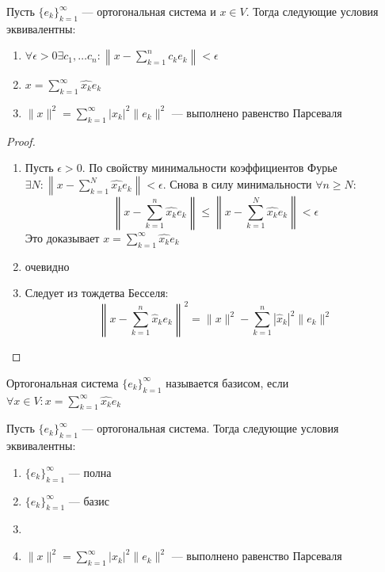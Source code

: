 \begin{theorem}
    Пусть \(\{e_k\}_{k = 1}^\infty\) --- ортогональная система и \(x \in V\). Тогда следующие условия эквивалентны:
    \begin{enumerate}
        \item \(\forall \epsilon > 0 \exists c_1, \dots c_n: \left\|x - \sum_{k = 1}^n c_ke_k\right\| < \epsilon\)
        \item \(x = \sum_{k = 1}^\infty \hat{x_k}e_k\)
        \item \(\|x\|^2 = \sum_{k = 1}^\infty |x_k|^2 \|e_k\|^2\) --- выполнено равенство Парсеваля
    \end{enumerate}
\end{theorem}
\begin{proof}
    \begin{enumerate}
        \item[\((1) \Ra (2)\)] Пусть \(\epsilon > 0\). По свойству минимальности коэффициентов Фурье \(\exists N: \left\| x - \sum_{k = 1}^N \hat{x_k}e_k \right\| < \epsilon\). Снова в силу минимальности \(\forall n \ge N\):
        \[\left\| x - \sum_{k = 1}^n \hat{x_k}e_k \right\| \le \left\| x - \sum_{k = 1}^N \hat{x_k}e_k \right\| < \epsilon\]
        Это доказывает \(x = \sum_{k = 1}^\infty \hat{x_k}e_k\)
        \item[\((2) \Ra (1)\)] очевидно
        \item[\((2) \Lra (3)\)] Следует из тождетва Бесселя:
        \[\left\| x - \sum_{k = 1}^n \widehat{x}_ke_k \right\|^2 = \|x\|^2 - \sum_{k = 1}^n |\widehat{x}_k|^2 \|e_k\|^2 \]
    \end{enumerate}
\end{proof}

\begin{definition}
    Ортогональная система \(\{e_k\}_{k = 1}^\infty\) называется базисом, если \(\forall x \in V: x = \sum_{k = 1}^\infty \hat{x_k}e_k\)
\end{definition}

\begin{corollary}
    Пусть \(\{e_k\}_{k = 1}^\infty\) --- ортогональная система. Тогда следующие условия эквивалентны:
    \begin{enumerate}
        \item \(\{e_k\}_{k = 1}^\infty\) --- полна
        \item \(\{e_k\}_{k = 1}^\infty\) --- базис
        \item \item \(\|x\|^2 = \sum_{k = 1}^\infty |x_k|^2 \|e_k\|^2\) --- выполнено равенство Парсеваля
    \end{enumerate}
\end{corollary}

